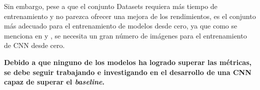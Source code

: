 Sin embargo, pese a que el conjunto Datasets requiera más tiempo de entrenamiento y no parezca ofrecer una mejora de los rendimientos, es el conjunto más adecuado para el entrenamiento de modelos desde cero, ya que como se menciona en \cite{large_datasets} y \cite{imagenet}, se necesita un gran número de imágenes para el entrenamiento de CNN desde cero.

\textbf{Debido a que ninguno de los modelos ha logrado superar las métricas, se debe seguir trabajando e investigando en el desarrollo de una CNN capaz de superar el \textit{baseline}.}